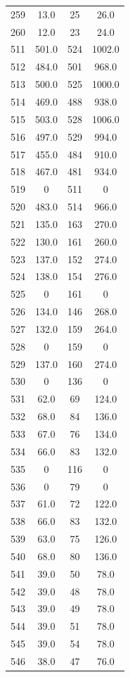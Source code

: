 \documentclass[12pt, a4paper]{report}
\begin{document}
\begin{longtable}{| c | c | c | c |}
  259 & 13.0 & 25 & 26.0 \\
  260 & 12.0 & 23 & 24.0 \\
  511 & 501.0 & 524 & 1002.0 \\
  512 & 484.0 & 501 & 968.0 \\
  513 & 500.0 & 525 & 1000.0 \\
  514 & 469.0 & 488 & 938.0 \\
  515 & 503.0 & 528 & 1006.0 \\
  516 & 497.0 & 529 & 994.0 \\
  517 & 455.0 & 484 & 910.0 \\
  518 & 467.0 & 481 & 934.0 \\
  519 & 0 & 511 & 0 \\
  520 & 483.0 & 514 & 966.0 \\
  521 & 135.0 & 163 & 270.0 \\
  522 & 130.0 & 161 & 260.0 \\
  523 & 137.0 & 152 & 274.0 \\
  524 & 138.0 & 154 & 276.0 \\
  525 & 0 & 161 & 0 \\
  526 & 134.0 & 146 & 268.0 \\
  527 & 132.0 & 159 & 264.0 \\
  528 & 0 & 159 & 0 \\
  529 & 137.0 & 160 & 274.0 \\
  530 & 0 & 136 & 0 \\
  531 & 62.0 & 69 & 124.0 \\
  532 & 68.0 & 84 & 136.0 \\
  533 & 67.0 & 76 & 134.0 \\
  534 & 66.0 & 83 & 132.0 \\
  535 & 0 & 116 & 0 \\
  536 & 0 & 79 & 0 \\
  537 & 61.0 & 72 & 122.0 \\
  538 & 66.0 & 83 & 132.0 \\
  539 & 63.0 & 75 & 126.0 \\
  540 & 68.0 & 80 & 136.0 \\
  541 & 39.0 & 50 & 78.0 \\
  542 & 39.0 & 48 & 78.0 \\
  543 & 39.0 & 49 & 78.0 \\
  544 & 39.0 & 51 & 78.0 \\
  545 & 39.0 & 54 & 78.0 \\
  546 & 38.0 & 47 & 76.0 \\

\end{longtable}
\end{document}
